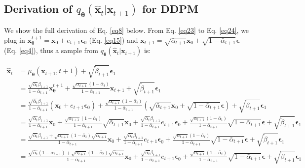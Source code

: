 \documentclass{article} \usepackage{iclr2024_conference,times}
\begin{document}
\subsection{Derivation of \texorpdfstring{$q_{\pmb{\theta}}(\hat{\pmb{x}}_{t} | \pmb{x}_{t+1})$}{Lg} for DDPM}
\label{Append:1}

We show the full derivation of Eq. \ref{eq8} below. From Eq. \ref{eq23} to Eq. \ref{eq24}, we plug in $\pmb{x}^{t+1}_{\pmb{\theta}} = \pmb{x}_{0} + e_{t+1}\pmb{\epsilon}_0$ (Eq. \ref{eq15}) and $\pmb{x}_{t+1} = \sqrt{\bar{\alpha}_{t+1}} \pmb{x}_0 + \sqrt{1 -\bar{\alpha}_{t+1}} \pmb{\epsilon}$ (Eq. \ref{eq4}), thus a sample from $q_{\pmb{\theta}}(\hat{\pmb{x}}_{t} | \pmb{x}_{t+1})$ is:

\begin{align}
\hat{\pmb{x}}_{t} & = \mu_{\pmb{\theta}}(\pmb{x}_{t+1}, t+1) + \sqrt{ \tilde{\beta}_{t+1}} \pmb{\epsilon}_1 \nonumber \\
& = \frac{\sqrt{\bar{\alpha}_{t}} \beta_{t+1}}{1-\bar{\alpha}_{t+1}} \pmb{x}^{t+1}_{\pmb{\theta}} + \frac{\sqrt{\alpha_{t+1}}(1-\bar{\alpha}_{t})}{1-\bar{\alpha}_{t+1}} \pmb{x}_{t+1} + \sqrt{ \tilde{\beta}_{t+1}} \pmb{\epsilon}_1 \label{eq23} \\
& = \frac{\sqrt{\bar{\alpha}_{t}} \beta_{t+1}}{1-\bar{\alpha}_{t+1}} (\pmb{x}_{0} + e_{t+1}\pmb{\epsilon}_0) + \frac{\sqrt{\alpha_{t+1}}(1-\bar{\alpha}_{t})}{1-\bar{\alpha}_{t+1}} (\sqrt{\bar{\alpha}_{t+1}} \pmb{x}_0 + \sqrt{1 -\bar{\alpha}_{t+1}} \pmb{\epsilon}) + \sqrt{ \tilde{\beta}_{t+1}} \pmb{\epsilon}_1 \label{eq24} \\
& = \frac{\sqrt{\bar{\alpha}_{t}} \beta_{t+1}}{1-\bar{\alpha}_{t+1}} \pmb{x}_{0} + \frac{\sqrt{\alpha_{t+1}}(1-\bar{\alpha}_{t})}{1-\bar{\alpha}_{t+1}} \sqrt{\bar{\alpha}_{t+1}} \pmb{x}_0 + \frac{\sqrt{\bar{\alpha}_{t}} \beta_{t+1}}{1-\bar{\alpha}_{t+1}} e_{t+1}\pmb{\epsilon}_0 + \frac{\sqrt{\alpha_{t+1}}(1-\bar{\alpha}_{t})}{1-\bar{\alpha}_{t+1}} \sqrt{1 -\bar{\alpha}_{t+1}} \pmb{\epsilon} + \sqrt{ \tilde{\beta}_{t+1}} \pmb{\epsilon}_1 \nonumber \\
& = \frac{\sqrt{\bar{\alpha}_{t}} \beta_{t+1} + \sqrt{\alpha_{t+1}}(1-\bar{\alpha}_{t}) \sqrt{\bar{\alpha}_{t+1}} }{1-\bar{\alpha}_{t+1}}  \pmb{x}_{0} + \frac{\sqrt{\bar{\alpha}_{t}} \beta_{t+1}}{1-\bar{\alpha}_{t+1}} e_{t+1}\pmb{\epsilon}_0 + \frac{\sqrt{\alpha_{t+1}}(1-\bar{\alpha}_{t})}{1-\bar{\alpha}_{t+1}} \sqrt{1 -\bar{\alpha}_{t+1}} \pmb{\epsilon} + \sqrt{ \tilde{\beta}_{t+1}} \pmb{\epsilon}_1 \nonumber \\
& = \frac{\sqrt{\bar{\alpha}_{t}} (1-\alpha_{t+1})  + \sqrt{\alpha_{t+1}}(1-\bar{\alpha}_{t}) \sqrt{\bar{\alpha}_{t+1}} }{1-\bar{\alpha}_{t+1}}  \pmb{x}_{0} + \frac{\sqrt{\bar{\alpha}_{t}} \beta_{t+1}}{1-\bar{\alpha}_{t+1}} e_{t+1}\pmb{\epsilon}_0 + \frac{\sqrt{\alpha_{t+1}}(1-\bar{\alpha}_{t})}{1-\bar{\alpha}_{t+1}} \sqrt{1 -\bar{\alpha}_{t+1}} \pmb{\epsilon} + \sqrt{ \tilde{\beta}_{t+1}} \pmb{\epsilon}_1 \nonumber \\

\end{align}
\end{document}
